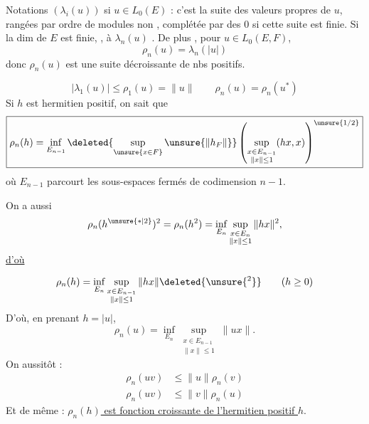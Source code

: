 
Notations $(\lambda_i(u))$ si $u\in L_0(E)$ : c'est la suite des valeurs  propres de $u$, rangées par ordre de modules non , complétée par des $0$ si cette suite est finie.
Si la dim de $E$ est finie, ,    à $\lambda_n(u)$    .
De plus , pour $u\in L_0(E,F)$,
\[
\boxed{\rho_n(u)=\lambda_n(|u|)}
\]
donc $\rho_n(u)$ est une suite décroissante de nbs positifs.

\qquad{}
\[
\boxed{|\lambda_1(u)|\leq\rho_1(u)=\|u\|}\qquad
\boxed{\rho_n(u)=\rho_n(u^*)}
\]
Si $h$ est hermitien positif, on sait que
\[
\boxed{\rho_n(h)=\inf_{E_{n-1}}\deleted{\sup_{\unsure{x\in F}}\unsure{\|h_F\|}}\left(\sup_{\substack{x\in E_{n-1}\\\|x\|\leq1}}(hx,x)\right)^{\unsure{1/2}}}
\]
où  $E_{n-1}$ parcourt  les sous-espaces  fermés de codimension $n-1$.

On a aussi
\[
\rho_n(h^{\unsure{*|2}})^2=\rho_n(h^2)=\inf_{E_n}\sup_{\substack{x\in E_n\\\|x\|\leq1}}\|hx\|^2,
\]
\uline{d'où}

\[
\rho_n(h)=\inf_{E_n}\sup_{\substack{x\in E_{n-1}\\\|x\|\leq1}}\|hx\|\deleted{\unsure{{}^2}}\qquad(h\geq0)
\]
D'où, en prenant $h=|u|$,
\[
\boxed{\rho_n(u)=\inf_{E_n}\sup_{\substack{x\in E_{n-1}\\\|x\|\leq1}}\|ux\|}.
\]
On   aussitôt :
\[
\boxed{\begin{aligned}
\rho_n(uv)&\leq\|u\|\rho_n(v)\\
\rho_n(uv)&\leq\|v\|\rho_n(u)
\end{aligned}}
\]
Et de même : \uline{$\rho_n(h)$ est fonction croissante de l'hermitien positif $h$}.

